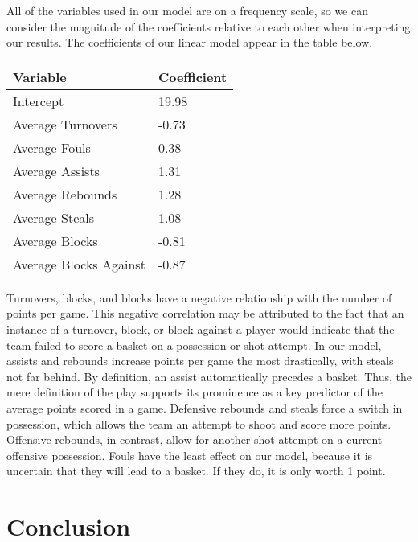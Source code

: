 \documentclass[
]{article}
\begin{document}
All of the variables used in our model are on a frequency scale, so we
can consider the magnitude of the coefficients relative to each other
when interpreting our results. The coefficients of our linear model
appear in the table below.

\begin{longtable}[]{@{}ll@{}}
\toprule
Variable & Coefficient\tabularnewline
\midrule
\endhead
Intercept & 19.98\tabularnewline
Average Turnovers & -0.73\tabularnewline
Average Fouls & 0.38\tabularnewline
Average Assists & 1.31\tabularnewline
Average Rebounds & 1.28\tabularnewline
Average Steals & 1.08\tabularnewline
Average Blocks & -0.81\tabularnewline
Average Blocks Against & -0.87\tabularnewline
\bottomrule
\end{longtable}

Turnovers, blocks, and blocks have a negative relationship with the
number of points per game. This negative correlation may be attributed
to the fact that an instance of a turnover, block, or block against a
player would indicate that the team failed to score a basket on a
possession or shot attempt. In our model, assists and rebounds increase
points per game the most drastically, with steals not far behind. By
definition, an assist automatically precedes a basket. Thus, the mere
definition of the play supports its prominence as a key predictor of the
average points scored in a game. Defensive rebounds and steals force a
switch in possession, which allows the team an attempt to shoot and
score more points. Offensive rebounds, in contrast, allow for another
shot attempt on a current offensive possession. Fouls have the least
effect on our model, because it is uncertain that they will lead to a
basket. If they do, it is only worth 1 point.

\hypertarget{conclusion}{%
\section{Conclusion}\label{conclusion}}
\end{document}
